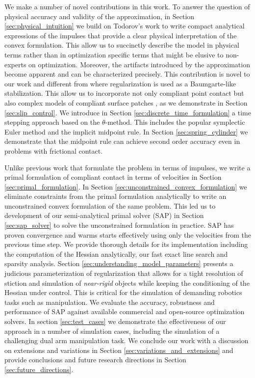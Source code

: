 We make a number of novel contributions in this work. To answer the question of
physical accuracy and validity of the approximation, in Section
\ref{sec:physical_intuition} we build on Todorov's work \cite{bib:todorov2014}
to write compact analytical expressions of the impulses that provide a clear
physical interpretation of the convex formulation. This allow us to succinctly
describe the model in physical terms rather than in optimization specific terms
that might be elusive to non-experts on optimization. Moreover, the artifacts
introduced by the approximation become apparent and can be characterized
precisely. This contribution is novel to our work and different from
\cite{bib:todorov2014} where regularization is used as a Baumgarte-like
stabilization. This allow us to incorporate not only compliant point contact but
also complex models of compliant surface patches \cite{bib:elandt2019pressure},
as we demonstrate in Section \ref{sec:slip_control}. We introduce in Section
\ref{sec:discrete_time_formulation} a time stepping approach  based on the
$\theta\text{-method}$. This includes the popular symplectic Euler method and
the implicit midpoint rule. In Section \ref{sec:spring_cylinder} we demonstrate
that the midpoint rule can achieve second order accuracy even in problems with
frictional contact.

Unlike previous work \cite{bib:anitescu2010,bib:todorov2014} that formulate the
problem in terms of impulses, we write a primal formulation of compliant contact
in terms of velocities in Section \ref{sec:primal_formulation}. In Section
\ref{sec:unconstrained_convex_formulation} we eliminate constraints from the
primal formulation analytically to write an unconstrained convex formulation of
the same problem. This led us to development of our semi-analytical primal
solver (SAP) in Section \ref{sec:sap_solver} to solve the unconstrained
formulation in practice. SAP has proven convergence and warms starts effectively
using only the velocities from the previous time step. We provide thorough
details for its implementation including the computation of the Hessian
analytically, our fast exact line search and sparsity analysis. Section
\ref{sec:understanding_model_parameters} presents a judicious parameterization
of regularization that allows for a tight resolution of stiction and simulation
of \emph{near-rigid} objects while keeping the conditioning of the Hessian under
control. This is critical for the simulation of demanding robotics tasks such as
manipulation. We evaluate the accuracy, robustness and performance of SAP
against available commercial and open-source optimization solvers. In section
\ref{sec:test_cases} we demonstrate the effectiveness of our approach in a
number of simulation cases, including the simulation of a challenging dual arm
manipulation task. We conclude our work with a discussion on extensions and
variations in Section \ref{sec:variations_and_extensions} and provide
conclusions and future research directions in Section
\ref{sec:future_directions}.
